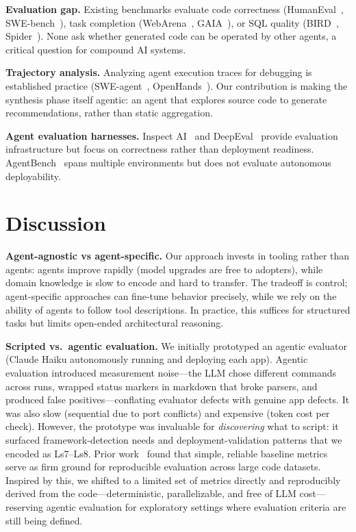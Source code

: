 \documentclass[sigconf,review]{acmart}
\begin{document}
\textbf{Evaluation gap.} Existing benchmarks evaluate code correctness (HumanEval~\cite{chen2021evaluating}, SWE-bench~\cite{jimenez2024swe}), task completion (WebArena~\cite{zhou2024webarena}, GAIA~\cite{mialon2023gaia}), or SQL quality (BIRD~\cite{bird2023}, Spider~\cite{yu2018spider}). None ask whether generated code can be operated by other agents, a critical question for compound AI systems.

\textbf{Trajectory analysis.} Analyzing agent execution traces for debugging is established practice (SWE-agent~\cite{yang2024swe}, OpenHands~\cite{wang2024openhands}). Our contribution is making the synthesis phase itself agentic: an agent that explores source code to generate recommendations, rather than static aggregation.

\textbf{Agent evaluation harnesses.} Inspect AI~\cite{inspectai2024} and DeepEval~\cite{deepeval2024} provide evaluation infrastructure but focus on correctness rather than deployment readiness. AgentBench~\cite{agentbench2023} spans multiple environments but does not evaluate autonomous deployability.

\section{Discussion}
\label{sec:discussion}

\textbf{Agent-agnostic vs agent-specific.} Our approach invests in tooling rather than agents: agents improve rapidly (model upgrades are free to adopters), while domain knowledge is slow to encode and hard to transfer. The tradeoff is control; agent-specific approaches can fine-tune behavior precisely, while we rely on the ability of agents to follow tool descriptions. In practice, this suffices for structured tasks but limits open-ended architectural reasoning.

\textbf{Scripted vs.\ agentic evaluation.} We initially prototyped an agentic evaluator (Claude Haiku autonomously running and deploying each app). Agentic evaluation introduced measurement noise---the LLM chose different commands across runs, wrapped status markers in markdown that broke parsers, and produced false positives---conflating evaluator defects with genuine app defects. It was also slow (sequential due to port conflicts) and expensive (token cost per check). However, the prototype was invaluable for \emph{discovering} what to script: it surfaced framework-detection needs and deployment-validation patterns that we encoded as Ls7--Ls8. Prior work~\cite{kniazev2026classification} found that simple, reliable baseline metrics serve as firm ground for reproducible evaluation across large code datasets. Inspired by this, we shifted to a limited set of metrics directly and reproducibly derived from the code---deterministic, parallelizable, and free of LLM cost---reserving agentic evaluation for exploratory settings where evaluation criteria are still being defined.
\end{document}
